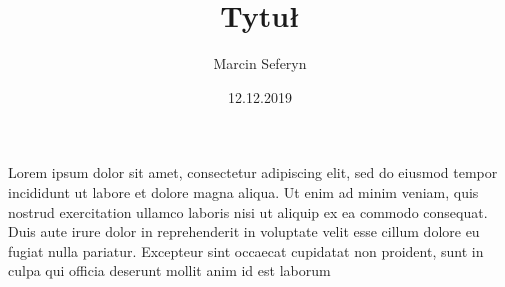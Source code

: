 \documentclass{article}
\title{Tytuł}
\author{Marcin Seferyn}
\date{12.12.2019}
\begin{document}
\maketitle
Lorem ipsum dolor sit amet, consectetur adipiscing elit, sed do eiusmod tempor incididunt ut labore et dolore magna aliqua. Ut enim ad minim veniam, quis nostrud exercitation ullamco laboris nisi ut aliquip ex ea commodo consequat. Duis aute irure dolor in reprehenderit in voluptate velit esse cillum dolore eu fugiat nulla pariatur. Excepteur sint occaecat cupidatat non proident, sunt in culpa qui officia deserunt mollit anim id est laborum
\end{document}
